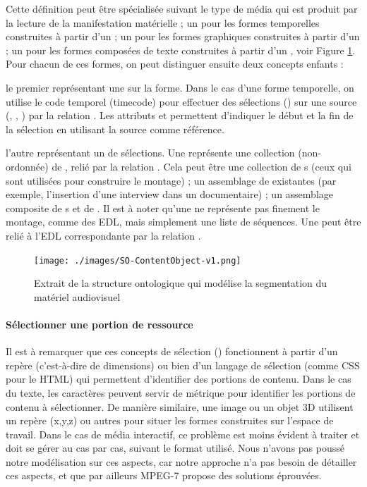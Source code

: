 Cette définition peut être spécialisée suivant le type de média qui est produit par la lecture de la manifestation matérielle ; un  pour les formes temporelles construites à partir d'un  ; un  pour les formes graphiques construites à partir d'un  ; un  pour les formes composées de texte construites à partir d'un , voir Figure \ref{img:so-content}.
Pour chacun de ces formes, on peut distinguer ensuite deux concepts enfants :
\begin{listeni} 
	\item le premier représentant une  sur la forme. 
	Dans le cas d'une forme temporelle, on utilise le code temporel (timecode) pour effectuer des sélections () sur une source (, , ) par la relation . 
	Les attributs  et  permettent d'indiquer le début et la fin de la sélection en utilisant la source comme référence.
	
	\item l'autre représentant un  de sélections. 
	Une  représente une collection (non-ordonnée) de , relié par la relation . 
	Cela peut être une collection de s (ceux qui sont utilisées pour construire le montage) ; un assemblage de  existantes (par exemple, l'insertion d'une interview dans un documentaire) ; un assemblage composite de s et de .
	Il est à noter qu'une  ne représente pas finement le montage, comme des EDL, mais simplement une liste de séquences. Une  peut être relié à l'EDL correspondante par la relation .
\end{listeni}

\begin{figure}[ht!]
\centering
\texttt{[image: ./images/SO-ContentObject-v1.png]}
\caption{Extrait de la structure ontologique qui modélise la segmentation du matériel audiovisuel}
\label{img:so-content}
\end{figure}

\paragraph{Sélectionner une portion de ressource}
Il est à remarquer que ces concepts de sélection () fonctionnent à partir d'un repère (c'est-à-dire de dimensions) ou bien d'un langage de sélection (comme CSS pour le HTML) qui permettent d'identifier des portions de contenu.
Dans le cas du texte, les caractères peuvent servir de métrique pour identifier les portions de contenu à sélectionner. 
De manière similaire, une image ou un objet 3D utilisent un repère (x,y,z) ou autres pour situer les formes construites sur l'espace de travail.
Dans le cas de média interactif, ce problème est moins évident à traiter et doit se gérer au cas par cas, suivant le format utilisé. 
Nous n'avons pas poussé notre modélisation sur ces aspects, car notre approche n'a pas besoin de détailler ces aspects, et que par ailleurs MPEG-7 propose des solutions éprouvées.

